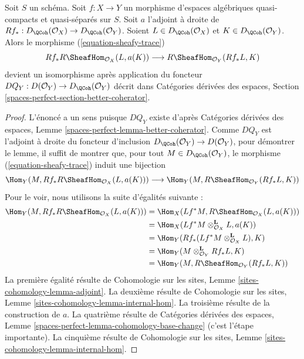\begin{lemma}
\label{lemma-iso-on-RSheafHom}
Soit $S$ un schéma.
Soit $f : X \to Y$ un morphisme d'espaces algébriques quasi-compacts et quasi-séparés
sur $S$.
Soit $a$ l'adjoint à droite de
$Rf_* : D_\QCoh(\mathcal{O}_X) \to D_\QCoh(\mathcal{O}_Y)$.
Soient $L \in D_\QCoh(\mathcal{O}_X)$ et
$K \in D_\QCoh(\mathcal{O}_Y)$.
Alors le morphisme (\ref{equation-sheafy-trace})
$$
Rf_*R\SheafHom_{\mathcal{O}_X}(L, a(K))
\longrightarrow
R\SheafHom_{\mathcal{O}_Y}(Rf_*L, K)
$$
devient un isomorphisme après application du foncteur
$DQ_Y : D(\mathcal{O}_Y) \to D_\QCoh(\mathcal{O}_Y)$
décrit dans Catégories dérivées des espaces, Section
\ref{spaces-perfect-section-better-coherator}.
\end{lemma}

\begin{proof}
L'énoncé a un sens puisque $DQ_Y$ existe d'après
Catégories dérivées des espaces, Lemme
\ref{spaces-perfect-lemma-better-coherator}.
Comme $DQ_Y$ est l'adjoint à droite du foncteur d'inclusion
$D_\QCoh(\mathcal{O}_Y) \to D(\mathcal{O}_Y)$,
pour démontrer le lemme, il suffit de montrer que, pour tout
$M \in D_\QCoh(\mathcal{O}_Y)$,
le morphisme (\ref{equation-sheafy-trace}) induit une bijection
$$
\Hom_Y(M, Rf_*R\SheafHom_{\mathcal{O}_X}(L, a(K)))
\longrightarrow
\Hom_Y(M, R\SheafHom_{\mathcal{O}_Y}(Rf_*L, K))
$$
Pour le voir, nous utilisons la suite d'égalités suivante :
\begin{align*}
\Hom_Y(M, Rf_*R\SheafHom_{\mathcal{O}_X}(L, a(K)))
& =
\Hom_X(Lf^*M, R\SheafHom_{\mathcal{O}_X}(L, a(K))) \\
& =
\Hom_X(Lf^*M \otimes_{\mathcal{O}_X}^\mathbf{L} L, a(K)) \\
& =
\Hom_Y(Rf_*(Lf^*M \otimes_{\mathcal{O}_X}^\mathbf{L} L), K) \\
& =
\Hom_Y(M \otimes_{\mathcal{O}_Y}^\mathbf{L} Rf_*L, K) \\
& =
\Hom_Y(M, R\SheafHom_{\mathcal{O}_Y}(Rf_*L, K))
\end{align*}
La première égalité résulte de Cohomologie sur les sites, Lemme
\ref{sites-cohomology-lemma-adjoint}.
La deuxième résulte de Cohomologie sur les sites, Lemme
\ref{sites-cohomology-lemma-internal-hom}.
La troisième résulte de la construction de $a$.
La quatrième résulte de Catégories dérivées des espaces, Lemme
\ref{spaces-perfect-lemma-cohomology-base-change} (c'est l'étape importante).
La cinquième résulte de Cohomologie sur les sites, Lemme
\ref{sites-cohomology-lemma-internal-hom}.
\end{proof}

